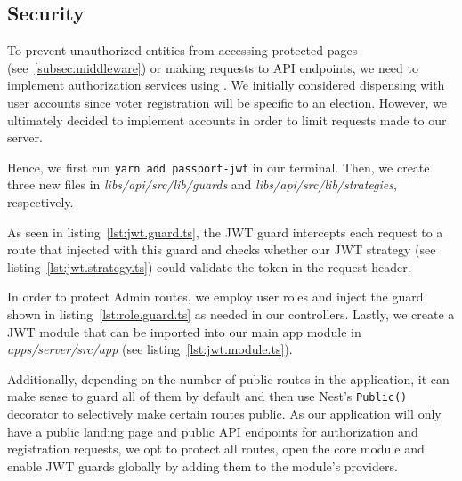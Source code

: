 \subsection{Security}\label{subsec:security}

To prevent unauthorized entities from accessing protected pages (see~\ref{subsec:middleware}) or making requests to \gls{API} endpoints, we need to implement authorization services using .
We initially considered dispensing with user accounts since voter registration will be specific to an election.
However, we ultimately decided to implement accounts in order to limit requests made to our server.

Hence, we first run \texttt{yarn add passport-jwt} in our terminal.
Then, we create three new files in \emph{libs/api/src/lib/guards} and \emph{libs/api/src/lib/strategies}, respectively.

As seen in listing~\ref{lst:jwt.guard.ts}, the \gls{JWT} guard intercepts each request to a route that injected with this guard and checks whether our \gls{JWT} strategy (see listing~\ref{lst:jwt.strategy.ts}) could validate the token in the request header.


In order to protect \gls{Admin} routes, we employ user roles and inject the guard shown in listing~\ref{lst:role.guard.ts} as needed in our controllers.
Lastly, we create a \gls{JWT} module that can be imported into our main app module in \emph{apps/server/src/app} (see listing~\ref{lst:jwt.module.ts}).


Additionally, depending on the number of public routes in the application, it can make sense to guard all of them by default and then use Nest's \texttt{Public()} decorator to selectively make certain routes public.
As our application will only have a public landing page and public \gls{API} endpoints for authorization and registration requests, we opt to protect all routes, open the core module and enable \gls{JWT} guards globally by adding them to the module's providers.

